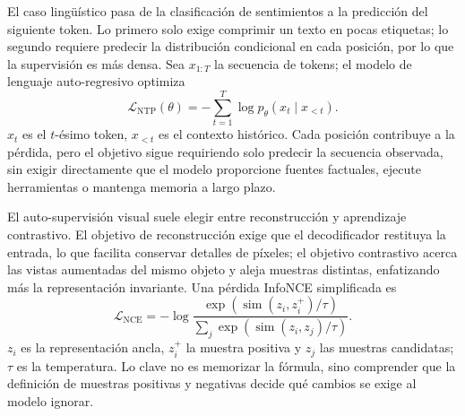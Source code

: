 El caso lingüístico pasa de la clasificación de sentimientos a la predicción del siguiente token. Lo primero solo exige comprimir un texto en pocas etiquetas; lo segundo requiere predecir la distribución condicional en cada posición, por lo que la supervisión es más densa. Sea $x_{1:T}$ la secuencia de tokens; el modelo de lenguaje auto-regresivo optimiza
\[
\mathcal{L}_{\mathrm{NTP}}(\theta)
=-\sum_{t=1}^{T}\log p_{\theta}(x_t\mid x_{<t}).
\]
$x_t$ es el $t$-ésimo token, $x_{<t}$ es el contexto histórico. Cada posición contribuye a la pérdida, pero el objetivo sigue requiriendo solo predecir la secuencia observada, sin exigir directamente que el modelo proporcione fuentes factuales, ejecute herramientas o mantenga memoria a largo plazo.




El auto-supervisión visual suele elegir entre reconstrucción y aprendizaje contrastivo. El objetivo de reconstrucción exige que el decodificador restituya la entrada, lo que facilita conservar detalles de píxeles; el objetivo contrastivo acerca las vistas aumentadas del mismo objeto y aleja muestras distintas, enfatizando más la representación invariante. Una pérdida InfoNCE simplificada es
\[
\mathcal{L}_{\mathrm{NCE}}
=-\log\frac{\exp(\operatorname{sim}(z_i,z_i^+)/\tau)}
{\sum_j \exp(\operatorname{sim}(z_i,z_j)/\tau)}.
\]
$z_i$ es la representación ancla, $z_i^+$ la muestra positiva y $z_j$ las muestras candidatas; $\tau$ es la temperatura. Lo clave no es memorizar la fórmula, sino comprender que la definición de muestras positivas y negativas decide qué cambios se exige al modelo ignorar.


